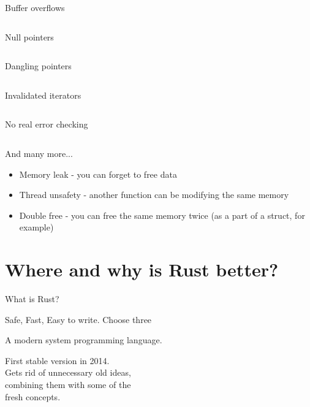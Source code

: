 \documentclass[usenames,dvipsnames,10pt,aspectratio=169]{beamer}
\begin{document}
\begin{frame}{Buffer overflows} 
	\inputminted[fontsize=\large]{c}{code/overflow.c}
\end{frame}

\begin{frame}{Null pointers}
	\inputminted[fontsize=\large]{c}{code/nullp.c}
\end{frame}

\begin{frame}{Dangling pointers} 
	\inputminted[fontsize=\large]{c}{code/danp.c}
\end{frame}

\begin{frame}{Invalidated iterators} 
	\inputminted[fontsize=\large]{c}{code/iter.c}
\end{frame}

\begin{frame}{No real error checking} 
	\inputminted[fontsize=\large]{c}{code/errorcheck.c}
\end{frame}

\begin{frame}{And many more...}
	\large
	\begin{itemize}
		\item Memory leak - you can forget to free data
		\item Thread unsafety - another function can be modifying the same memory
		\item Double free - you can free the same memory twice (as a part of a struct, for example)
	\end{itemize}
\end{frame}



\section{Where and why is Rust better?}

\begin{frame}{What is Rust?}

	\LARGE{\textcolor{ucuyellow}{Safe, Fast, Easy to write. Choose three}}

\vspace{0.8cm}
\large
A modern system programming language.

\vspace{0.3cm}

First stable version in 2014.\\
Gets rid of unnecessary old ideas, \\
combining them with some of the\\
fresh concepts.
\end{frame}
\end{document}
